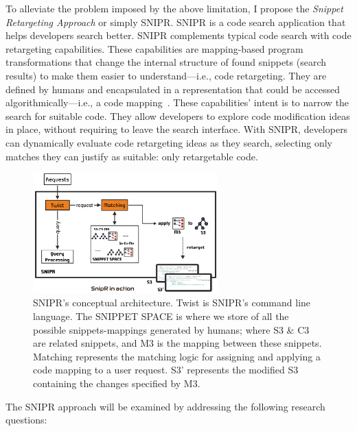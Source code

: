 \documentclass[conference]{IEEEtran}
\begin{document}
To alleviate the problem imposed by the above limitation, I propose the \emph{Snippet Retargeting Approach} or simply \uppercase{SnipR}. \uppercase{SnipR} is a code search application that helps developers search better. \uppercase{SnipR} complements typical code search with code retargeting capabilities. These capabilities are mapping-based program transformations that change the internal structure of found snippets (search results) to make them easier to understand---i.e., code retargeting. They are defined by humans and encapsulated in a representation that could be accessed algorithmically---i.e., a code mapping~\cite{Nita:2010en}. These capabilities' intent is to narrow the search for suitable code. They allow developers to explore code modification ideas in place, without requiring to leave the search interface. With \uppercase{SNIPR}, developers can dynamically evaluate code retargeting ideas as they search, selecting only matches they can justify as suitable: only retargetable code.


\begin{figure}[!t]
    \centering
    \includegraphics[width=2.8in]{images/halfsnipr}
    \caption{\uppercase{SnipR}'s conceptual architecture. Twist is SNIPR's command line language. 
    The SNIPPET SPACE is where we store of all the 
    possible snippets-mappings generated by humans; where S3 \& C3 are related snippets, and M3 
    is the mapping between these snippets. Matching represents the matching logic for assigning and applying  
    a code mapping to a user request. S3' represents the modified S3 containing the changes specified 
    by M3.}
    \label{fig:architecture}
\end{figure}

The \uppercase{SnipR} approach will be examined by addressing the following research questions:
\end{document}

